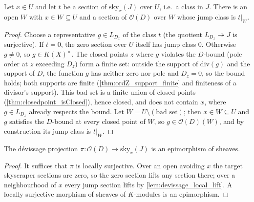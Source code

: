 \begin{lemma}
  \label{lem:devissage_local_lift}
  \leanok
  Let \(x \in U\) and let \(t\) be a section of \(\mathrm{sky}_x(J)\) over \(U\), i.e.\ a class in
  \(J\). There is an open \(W\) with \(x \in W \subseteq U\) and a section of \(\mathcal O(D)\) over
  \(W\) whose jump class is \(t|_W\).
\end{lemma}
\begin{proof}
  \leanok
  Choose a representative \(g \in L_{D_x}\) of the class \(t\) (the quotient
  \(L_{D_x} \twoheadrightarrow J\) is surjective). If \(t = 0\), the zero section over \(U\) itself
  has jump class \(0\). Otherwise \(g \neq 0\), so \(g \in K(X)^\times\). The closed points \(z\)
  where \(g\) violates the \(D\)-bound (pole order at \(z\) exceeding \(D_z\)) form a finite set:
  outside the support of \(\mathrm{div}(g)\) and the support of \(D\), the function \(g\) has neither
  zero nor pole and \(D_z = 0\), so the bound holds; both supports are finite
  (\ref{thm:ordZ_support_finite} and finiteness of a divisor's support). This bad set is a finite
  union of closed points (\ref{thm:closedpoint_isClosed}), hence closed, and does not contain \(x\),
  where \(g \in L_{D_x}\) already respects the bound. Let \(W = U \setminus (\text{bad set})\); then
  \(x \in W \subseteq U\) and \(g\) satisfies the \(D\)-bound at every closed point of \(W\), so
  \(g \in \mathcal O(D)(W)\), and by construction its jump class is \(t|_W\).
\end{proof}

\begin{theorem}
  \label{thm:devissageSES_epi_g}
  \leanok
  The dévissage projection \(\pi : \mathcal O(D) \to \mathrm{sky}_x(J)\) is an epimorphism of
  sheaves.
\end{theorem}
\begin{proof}
  \leanok
  It suffices that \(\pi\) is locally surjective. Over an open avoiding \(x\) the target skyscraper
  sections are zero, so the zero section lifts any section there; over a neighbourhood of \(x\)
  every jump section lifts by \ref{lem:devissage_local_lift}. A locally surjective morphism of
  sheaves of \(K\)-modules is an epimorphism.
\end{proof}

